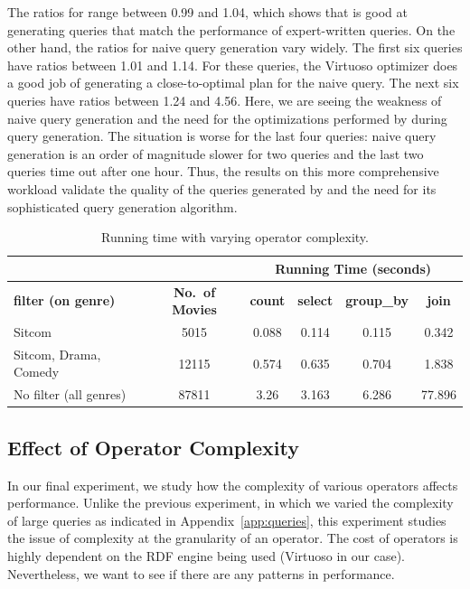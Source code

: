 The ratios for \rdfframes range between 0.99 and 1.04,
which shows that \rdfframes is good at generating queries that match the performance of expert-written queries. On the other hand, the ratios for naive query generation vary widely. The first six queries have ratios between 1.01 and 1.14.
For these queries, the Virtuoso optimizer does a good job of generating a close-to-optimal plan for the naive query.
The next six queries have ratios between 1.24 and 4.56.
Here, we are seeing the weakness of naive query generation and the need for the optimizations performed by \rdfframes during query generation. 
The situation is worse for the last four queries:  naive query generation is an order of magnitude slower for two queries and the last two queries time out after one hour.
Thus, the results on this more comprehensive workload validate the quality of the queries generated by \rdfframes and the need for its sophisticated query generation algorithm.

\begin{table}[th!]
  \caption{Running time with varying operator complexity.}
  \label{tab:cost}
  \centering
  \begin{tabular}{|l|c|c|c|c|c|} 
      \hline
   \multicolumn{2}{|c}{} & \multicolumn{4}{|c|}{\textbf{Running Time (seconds)}} \\ \hline
      \textbf{filter (on genre)} & \textbf{No.\ of Movies} & \textbf{count} & \textbf{select} & \textbf{group\_by} & \textbf{join}\\
      \hline
      Sitcom & 5015 & 0.088 & 0.114 & 0.115 & 0.342 \\ \hline 
      Sitcom, Drama, Comedy & 12115 & 0.574 & 0.635 & 0.704 &  1.838 \\ \hline 
      No filter (all genres) & 87811 & 3.26 & 3.163 & 6.286 & 77.896 \\ \hline 
  \end{tabular}
\end{table}

  \subsection{Effect of Operator Complexity}

\label{subsec:results-complexity}
\vspace*{-3pt}

In our final experiment, we study how the complexity of various \rdfframes operators affects performance.
Unlike the previous experiment, in which we varied the complexity of large queries as indicated in Appendix~\ref{app:queries},
this experiment studies the issue of complexity at the granularity of an operator.
The cost of operators is highly dependent on the RDF engine being used
(Virtuoso in our case).
Nevertheless, we want to see if there are any patterns in performance.

